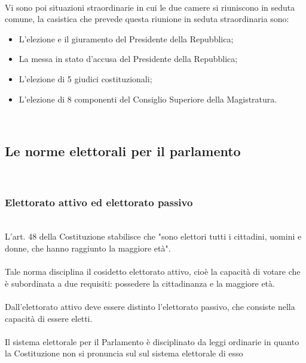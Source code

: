 \documentclass{report}
\begin{document}
\\
Vi sono poi situazioni straordinarie in cui le due camere si riuniscono in seduta comune, la casistica che prevede questa riunione in seduta straordinaria sono:
\begin{itemize}
  \item L'elezione e il giuramento del Presidente della Repubblica;
  \item La messa in stato d'accusa del Presidente della Repubblica;
  \item L'elezione di 5 giudici costituzionali;
  \item L'elezione di 8 componenti del Consiglio Superiore della Magistratura.
\end{itemize}
\\
\subsection{Le norme elettorali per il parlamento}
\\
\subsubsection{Elettorato attivo ed elettorato passivo}
\\
L'art. 48 della Costituzione stabilisce che "sono elettori tutti i cittadini, uomini e donne, che hanno raggiunto la maggiore età".
\\
\\
Tale norma disciplina il cosidetto elettorato attivo, cioè la capacità di votare che è subordinata a due requisiti: possedere la cittadinanza e la maggiore età. 
\\
\\
Dall'elettorato attivo deve essere distinto l'elettorato passivo, che consiste nella capacità di essere eletti.
\\
\\
Il sistema elettorale per il Parlamento è disciplinato da leggi ordinarie in quanto la Costituzione non si pronuncia sul sul sistema elettorale di esso
\\
\end{document}
